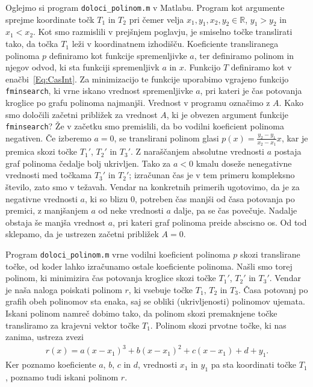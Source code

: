 \documentclass[a4paper]{article}
\begin{document}
Oglejmo si program \texttt{doloci\_polinom.m} v Matlabu.
Program kot argumente sprejme koordinate točk $T_1$ in $T_2$ pri čemer velja $x_1, y_1, x_2, y_2 \in \mathbb{R}$, $y_1 > y_2$ in $x_1 < x_2$. Kot smo razmislili v prejšnjem poglavju, je smiselno točke translirati tako, da točka $T_1$ leži v koordinatnem izhodišču. Koeficiente transliranega polinoma $p$ definiramo kot funkcije spremenljivke $a$, ter definiramo polinom in njegov odvod, ki sta funkciji spremenljivk $a$ in $x$. Funkcijo $T$ definiramo kot v enačbi~\eqref{Eq:CasInt}. Za minimizacijo te funkcije uporabimo vgrajeno funkcijo \texttt{fminsearch}, ki vrne iskano vrednost spremenljivke $a$, pri kateri je čas potovanja kroglice po grafu polinoma najmanjši. Vrednost v programu označimo z $A$.
Kako smo določili začetni približek za vrednost $A$, ki je obvezen argument funkcije \texttt{fminsearch}? Že v začetku smo premislili, da bo vodilni koeficient polinoma negativen. Če izberemo $a=0$, se translirani polinom glasi $p(x) = \frac{y_2-y_1}{x_2-x_1} x$, kar je premica skozi točke $T_{1}'$, $T_{2}'$ in $T_{3}'$. Z naraščanjem absolutne vrednosti $a$ postaja graf polinoma čedalje bolj ukrivljen. Tako za $a<0$ kmalu doseže nenegativne vrednosti med točkama $T_{3}'$ in $T_{2}'$; izračunan čas je v tem primeru kompleksno število, zato smo v težavah. Vendar na konkretnih primerih ugotovimo, da je za negativne vrednosti $a$, ki so blizu $0$, potreben čas manjši od časa potovanja po premici, z manjšanjem $a$ od neke vrednosti $a$ dalje, pa se čas povečuje. Nadalje obstaja še manjša vrednost $a$, pri kateri graf polinoma preide abscisno os. Od tod sklepamo, da je ustrezen začetni približek $A=0$.

Program \texttt{doloci\_polinom.m} vrne vodilni koeficient polinoma $p$ skozi translirane točke, od koder lahko izračunamo ostale koeficiente polinoma. 
Našli smo torej polinom, ki minimizira čas potovanja kroglice skozi točke $T_{1}'$, $T_{2}'$ in $T_{3}'$. Vendar je naša naloga poiskati polinom $r$, ki vsebuje točke $T_1$, $T_2$ in $T_3$. Časa potovanj po grafih obeh polinomov sta enaka, saj se obliki (ukrivljenosti) polinomov ujemata. Iskani polinom namreč dobimo tako, da polinom skozi premaknjene točke transliramo za krajevni vektor točke $T_1$.
Polinom skozi prvotne točke, ki nas zanima, ustreza zvezi
\begin{align}
\label{Eq:r(x)}
r(x) = a(x-x_1)^3 + b(x-x_1)^2 + c(x-x_1) + d + y_1.
\end{align}
Ker poznamo koeficiente $a$, $b$, $c$ in $d$, vrednosti $x_1$ in $y_1$ pa sta koordinati točke $T_1$, poznamo tudi iskani polinom $r$.
\end{document}
